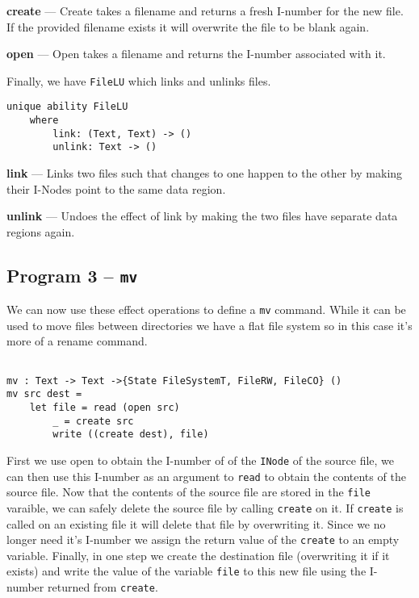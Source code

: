 \documentclass[logo,bsc,singlespacing,parskip]{infthesis}
\begin{document}
\textbf{create} --- Create takes a filename and returns a fresh I-number for
the new file. If the provided filename exists it will overwrite the file to be
blank again.

\textbf{open} --- Open takes a filename and returns the I-number associated with it.

Finally, we have \texttt{FileLU} which links and unlinks files.

\begin{lstlisting}[language=unison]
unique ability FileLU
    where
        link: (Text, Text) -> ()
        unlink: Text -> ()
\end{lstlisting}

\textbf{link} --- Links two files such that changes to one happen to the other by making their I-Nodes point to the same data region.

\textbf{unlink} --- Undoes the effect of link by making the two files have separate data regions again.

\begin{tcolorbox}[colback=gray!10, colframe=black, arc=0pt, outer arc=0pt]
  \section*{Program 3 -- \texttt{mv}}

  We can now use these effect operations to define a \texttt{mv} command. While
  it can be used to move files between directories we have a flat file system
  so in this case it's more of a rename command.

  \begin{lstlisting}[language=unison]

mv : Text -> Text ->{State FileSystemT, FileRW, FileCO} ()
mv src dest = 
    let file = read (open src)
        _ = create src
        write ((create dest), file)

  \end{lstlisting}

  First we use open to obtain the I-number of of the \texttt{INode} of the
  source file, we can then use this I-number as an argument to \texttt{read} to
  obtain the contents of the source file. Now that the contents of the source
  file are stored in the \texttt{file} varaible, we can safely delete the
  source file by calling \texttt{create} on it. If \texttt{create} is called on
  an existing file it will delete that file by overwriting it. Since we no
  longer need it's I-number we assign the return value of the \texttt{create}
  to an empty variable. Finally, in one step we create the destination file
  (overwriting it if it exists) and write the value of the variable
  \texttt{file} to this new file using the I-number returned from
  \texttt{create}.

\end{tcolorbox}
\end{document}

